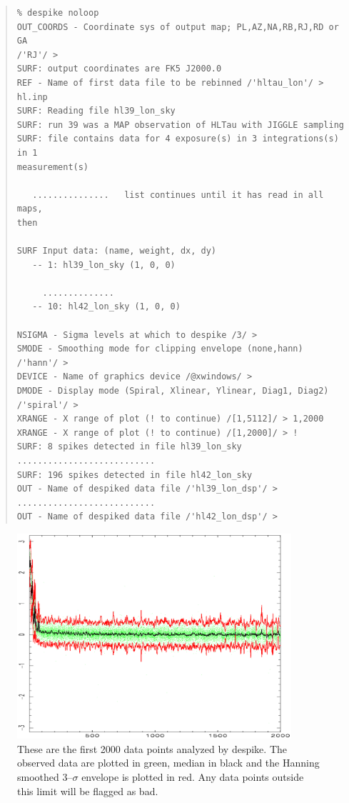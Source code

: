 \documentclass[twoside,11pt]{article}
\newenvironment{myquote}{\begin{quote}\begin{small}}{\end{small}\end{quote}}
\newcommand{\task}[1]{\textsf{#1}}
\newcommand{\desp}{\xref{\task{despike}}{sun216}{DESPIKE}}
\newcommand{\xref}[3]{#1}
\renewcommand{\_}{\texttt{\symbol{95}}}
\begin{document}
\begin{myquote}
\begin{verbatim}
% despike noloop
OUT_COORDS - Coordinate sys of output map; PL,AZ,NA,RB,RJ,RD or GA 
/'RJ'/ > 
SURF: output coordinates are FK5 J2000.0
REF - Name of first data file to be rebinned /'hltau_lon'/ > hl.inp
SURF: Reading file hl39_lon_sky
SURF: run 39 was a MAP observation of HLTau with JIGGLE sampling
SURF: file contains data for 4 exposure(s) in 3 integrations(s) in 1
measurement(s)

   ...............   list continues until it has read in all maps, 
then
 
SURF Input data: (name, weight, dx, dy)
   -- 1: hl39_lon_sky (1, 0, 0)

     ..............
   -- 10: hl42_lon_sky (1, 0, 0)
 
NSIGMA - Sigma levels at which to despike /3/ >
SMODE - Smoothing mode for clipping envelope (none,hann) /'hann'/ > 
DEVICE - Name of graphics device /@xwindows/ > 
DMODE - Display mode (Spiral, Xlinear, Ylinear, Diag1, Diag2) 
/'spiral'/ > 
XRANGE - X range of plot (! to continue) /[1,5112]/ > 1,2000
XRANGE - X range of plot (! to continue) /[1,2000]/ > !
SURF: 8 spikes detected in file hl39_lon_sky
...........................
SURF: 196 spikes detected in file hl42_lon_sky
OUT - Name of despiked data file /'hl39_lon_dsp'/ > 
...........................
OUT - Name of despiked data file /'hl42_lon_dsp'/ > 
\end{verbatim}
\end{myquote}



\begin{figure}
\begin{center}
\includegraphics[width=4in]{sc11_fig7.eps}
\caption{These are the first 2000 data points analyzed by \desp. The 
observed data are plotted in green, median in black and the Hanning 
smoothed 3--$\sigma$ envelope is plotted in red. Any data points 
outside this limit will be flagged as bad.}
\label{fig:desp}
\end{center}
\end{figure}
\end{document}
